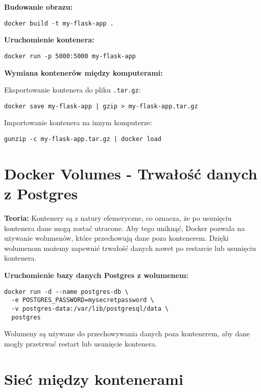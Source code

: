 \documentclass{article}
\begin{document}
\textbf{Budowanie obrazu:}

\noindent\begin{lstlisting}
docker build -t my-flask-app .
\end{lstlisting}

\textbf{Uruchomienie kontenera:}

\noindent\begin{lstlisting}
docker run -p 5000:5000 my-flask-app
\end{lstlisting}

\textbf{Wymiana kontenerów między komputerami:}

Eksportowanie kontenera do pliku \texttt{.tar.gz}:

\noindent\begin{lstlisting}
docker save my-flask-app | gzip > my-flask-app.tar.gz
\end{lstlisting}

Importowanie kontenera na innym komputerze:

\noindent\begin{lstlisting}
gunzip -c my-flask-app.tar.gz | docker load
\end{lstlisting}

\section{Docker Volumes - Trwałość danych z Postgres}

\textbf{Teoria:}  
Kontenery są z natury efemeryczne, co oznacza, że po usunięciu kontenera dane mogą zostać utracone. Aby tego uniknąć, Docker pozwala na używanie wolumenów, które przechowują dane poza kontenerem. Dzięki wolumenom możemy zapewnić trwałość danych nawet po restarcie lub usunięciu kontenera.

\textbf{Uruchomienie bazy danych Postgres z wolumenem:}

\noindent\begin{lstlisting}
docker run -d --name postgres-db \
  -e POSTGRES_PASSWORD=mysecretpassword \
  -v postgres-data:/var/lib/postgresql/data \
  postgres
\end{lstlisting}

Wolumeny są używane do przechowywania danych poza kontenerem, aby dane mogły przetrwać restart lub usunięcie kontenera.

\section{Sieć między kontenerami}
\end{document}
